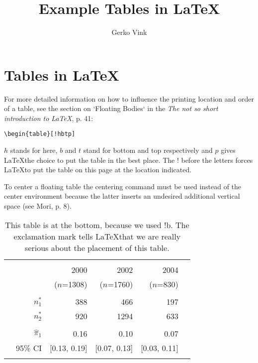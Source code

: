 \documentclass[10pt, fullpage, a4paper, titlepage]{article}
\title{Example Tables in \LaTeX}
\author{Gerko Vink}
\begin{document}
\maketitle
\newpage

\section{Tables in \LaTeX}
For more detailed information on how to influence the printing location and order of a table, see the section on `Floating Bodies` in the \emph{The not so short introduction to LaTeX}, p. 41:
\begin{verbatim}
\begin{table}[!hbtp]
\end{verbatim}
$h$ stands for here, $b$ and $t$ stand for bottom and top respectively and $p$ gives \LaTeX the choice to put the table in the best place. The $!$ before the letters forces \LaTeX to put the table on this page at the location indicated.

To center a floating table the \textsf{centering} command must be used instead of the center environment because the latter inserts an undesired additional vertical space (see Mori, p. 8).

\begin{table}[!b]
\caption{This table is at the bottom, because we used !b. The exclamation mark tells \LaTeX that we are really serious about the placement of this table.}
\begin{center}
\label{yourlabel}
\begin{tabular}{l r r r r r}
\hline \\
  & & 2000 & 2002 & 2004&   \\
& & \footnotesize{($n$=1308)} & \footnotesize{($n$=1760)} & \footnotesize{($n$=830)}&   \\
\cline{3-6}
\\
 & $n^{\ast}_{1}$&  388 & 466  & 197   & \\
 & $n^{\ast}_{2}$&  920 & 1294 & 633  & \\
\\
 & $\hat{\pi}_{1}$  & 0.16 & 0.10& 0.07&   \\
 &  95\% CI & [0.13, 0.19]& [0.07, 0.13] & [0.03, 0.11] & \\
\\
\hline
\end{tabular}
\end{center}
\end{table}
\end{document}
